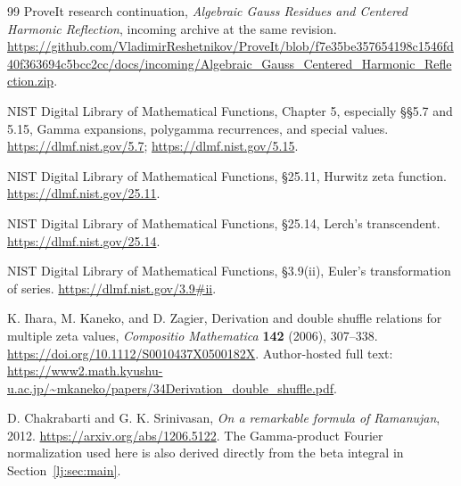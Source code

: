 \documentclass[11pt,a4paper]{article}
\numberwithin{equation}{section}
\theoremstyle{definition}
\theoremstyle{remark}
\begin{document}
\begin{thebibliography}{99}
ProveIt research continuation,
\emph{Algebraic Gauss Residues and Centered Harmonic Reflection},
incoming archive at the same revision.
\url{https://github.com/VladimirReshetnikov/ProveIt/blob/f7e35be357654198c1546fd40f363694c5bcc2cc/docs/incoming/Algebraic_Gauss_Centered_Harmonic_Reflection.zip}.

NIST Digital Library of Mathematical Functions,
Chapter 5, especially \S\S5.7 and 5.15,
Gamma expansions, polygamma recurrences, and special values.
\url{https://dlmf.nist.gov/5.7};
\url{https://dlmf.nist.gov/5.15}.

NIST Digital Library of Mathematical Functions,
\S25.11, Hurwitz zeta function.
\url{https://dlmf.nist.gov/25.11}.

NIST Digital Library of Mathematical Functions,
\S25.14, Lerch's transcendent.
\url{https://dlmf.nist.gov/25.14}.

NIST Digital Library of Mathematical Functions,
\S3.9(ii), Euler's transformation of series.
\url{https://dlmf.nist.gov/3.9#ii}.

K. Ihara, M. Kaneko, and D. Zagier,
Derivation and double shuffle relations for multiple zeta values,
\emph{Compositio Mathematica} \textbf{142} (2006), 307--338.
\url{https://doi.org/10.1112/S0010437X0500182X}.
Author-hosted full text:
\url{https://www2.math.kyushu-u.ac.jp/~mkaneko/papers/34Derivation_double_shuffle.pdf}.

D. Chakrabarti and G. K. Srinivasan,
\emph{On a remarkable formula of Ramanujan}, 2012.
\url{https://arxiv.org/abs/1206.5122}.
The Gamma-product Fourier normalization used here is also derived
directly from the beta integral in Section~\ref{lj:sec:main}.

\end{thebibliography}
\endgroup

\end{document}
